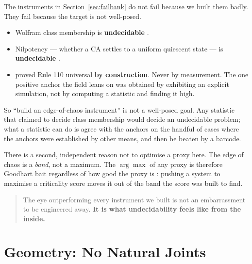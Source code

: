 \documentclass[man,12pt,floatsintext]{apa7}
\newif\ifdraftnotes
\newcommand{\dnote}[1]{\ifdraftnotes\textcolor{notecol}{\small\textbf{[NOTE:} #1\textbf{]}}\fi}
\begin{document}
The instruments in Section~\ref{sec:failbank} do not fail because we built
them badly. They fail because the target is not well-posed.

\begin{itemize}
  \item Wolfram class membership is \textbf{undecidable}
  \parencite{culik1988undecidability}.
  \item Nilpotency --- whether a CA settles to a uniform quiescent state ---
  is \textbf{undecidable} \parencite{kari1992nilpotency}.
  \item \textcite{cook2004universality} proved Rule 110 universal
  \textbf{by construction}. Never by measurement. The one positive anchor
  the field leans on was obtained by exhibiting an explicit simulation, not
  by computing a statistic and finding it high.
\end{itemize}

So ``build an edge-of-chaos instrument'' is not a well-posed goal. Any
statistic that claimed to decide class membership would decide an
undecidable problem; what a statistic can do is agree with the anchors on
the handful of cases where the anchors were established by other means, and
then be beaten by a barcode.

There is a second, independent reason not to optimise a proxy here. The
edge of chaos is a \emph{band}, not a maximum. The $\arg\max$ of any proxy
is therefore Goodhart bait regardless of how good the proxy is
\parencite{strathern1997improving}: pushing a system to maximise a
criticality score moves it out of the band the score was built to find.

\begin{quote}
The eye outperforming every instrument we built is not an embarrassment to
be engineered away. \textbf{It is what undecidability feels like from the
inside.}
\end{quote}

\dnote{The eye claim is the line the paper will be remembered by, and it is
the one an unsympathetic reviewer will hit hardest --- ``eye outperforms''
is asserted here on the strength of a single blind pick (2/15, the
aliveness result in Section~\ref{sec:failbank}). Either soften it to what
the blind pick supports, or run a proper human-baseline protocol. Decide
before submission; do not let it go out as-is.}

\section{Geometry: No Natural Joints}
\label{sec:geometry}
\end{document}
